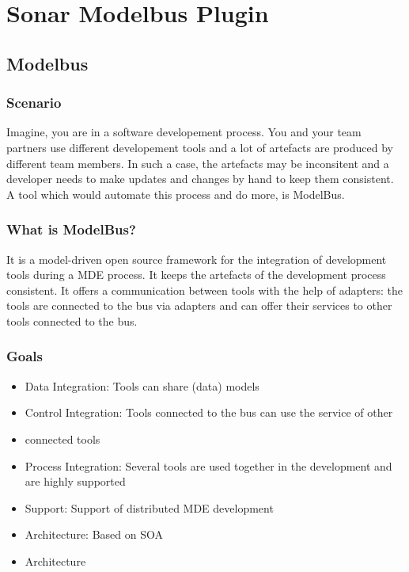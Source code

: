 \chapter{Sonar Modelbus Plugin}
\section{Modelbus}
\subsection{Scenario}

Imagine, you are in a software developement process. You and your team partners use different developement tools and a lot of artefacts are produced by different team members. In such a case, the artefacts may be inconsitent and a developer needs to make updates and changes by hand to keep them consistent. A tool which would automate this process and do more, is ModelBus.

\subsection{What is ModelBus?}

It is a model-driven open source framework for the integration of development tools during a MDE process. It keeps the artefacts of the development process consistent. It offers a communication between tools with the help of adapters: the tools are connected to the bus via adapters and can offer their services to other tools connected to the bus.

\subsection{Goals}
\begin{itemize}
\item Data Integration: Tools can share (data) models
\item Control Integration: Tools connected to the bus can use the service of other \item connected tools
\item Process Integration: Several tools are used together in the development and are highly supported
\item Support: Support of distributed MDE development
\item Architecture: Based on SOA
\item Architecture
\end{itemize}

